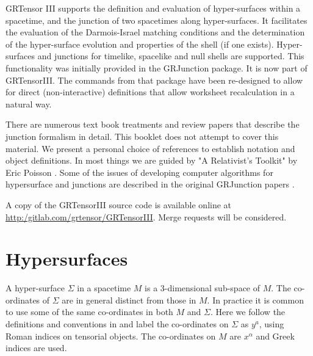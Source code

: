 \documentclass{article}
\begin{document}
\grtitle{\grHyperTitle}
\grlabel{\grHyperLabel}
\grtitlepage
%
\copyrightpage
\noindent 
GRTensor III supports the definition and evaluation of hyper-surfaces within a spacetime, and the junction
of two spacetimes along hyper-surfaces. It facilitates the evaluation of the Darmois-Israel matching conditions
and the determination of the hyper-surface evolution and properties of the shell (if one exists). 
Hyper-surfaces and junctions for timelike, spacelike and null shells are supported. This functionality was
initially provided in the GRJunction package. It is now part of GRTensorIII. The commands from that package have been re-designed to allow for
direct (non-interactive) definitions that allow worksheet recalculation in a natural way.

There are numerous text book treatments and review papers that describe the junction formalism in detail. This
booklet does not attempt to cover this material. We present a personal choice of references to establish notation
and object definitions. In most things we are guided by "A Relativist's Toolkit" by Eric Poisson \cite{poisson:2004}.
Some of the issues of developing computer algorithms for hypersurface and junctions are described in the original 
GRJunction papers \cite{musgravelake:1994, musgravelake:1997}.

A copy of the GRTensorIII source code is available online at 
\href{url}{http:/gitlab.com/grtensor/GRTensorIII}. Merge requests
will be considered. 

%
\section{Hypersurfaces}
A hyper-surface $\Sigma$ in a spacetime $M$ is a 3-dimensional sub-space of $M$. The co-ordinates of $\Sigma$ are in 
general distinct from those in $M$. In practice it is common to use some of the same co-ordinates in both $M$ and $\Sigma$. 
Here we follow the definitions and conventions in \cite{toolkit} and label the co-ordinates on $\Sigma$ as $y^a$, using Roman indices on tensorial objects. The co-ordinates on $M$ are $x^\alpha$ and Greek indices are used. 
\end{document}
